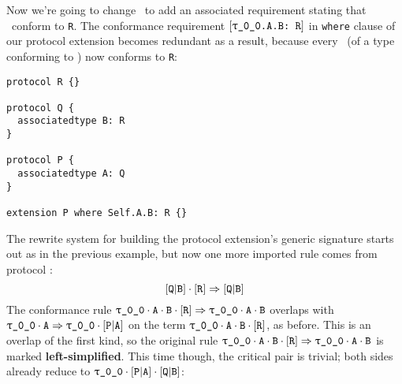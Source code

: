 \documentclass[../generics]{subfiles}
\begin{document}
\begin{example}
Now we're going to change \tQ\ to add an associated requirement stating that \nB\ conform to \texttt{R}. The conformance requirement $\ConfReq{\rT.A.B}{R}$ in \texttt{where} clause of our protocol extension becomes redundant as a result, because every \nB\ (of a type conforming to \tQ) now conforms to \texttt{R}:
\begin{Verbatim}
protocol R {}

protocol Q {
  associatedtype B: R
}

protocol P {
  associatedtype A: Q
}

extension P where Self.A.B: R {}
\end{Verbatim}
The rewrite system for building the protocol extension's generic signature starts out as in the previous example, but now one more imported rule comes from protocol \tQ:
\[[\texttt{Q}|\texttt{B}]\cdot[\texttt{R}]\Rightarrow [\texttt{Q}|\texttt{B}]\]
The conformance rule $\ProtoConf{\rT\cdot\nA\cdot\nB}{R}$ overlaps with $\rT\cdot\nA\Rightarrow\rT\cdot\aPA$ on the term $\rT\cdot\nA\cdot\nB\cdot\pR$, as before. This is an overlap of the first kind, so the original rule $\ProtoConf{\rT\cdot\nA\cdot\nB}{R}$ is marked \textbf{left-simplified}. This time though, the critical pair is trivial; both sides already reduce to $\rT\cdot\aPA\cdot\assocsym{Q}{B}$:
\begin{center}
\end{center}
\end{example}
\end{document}
